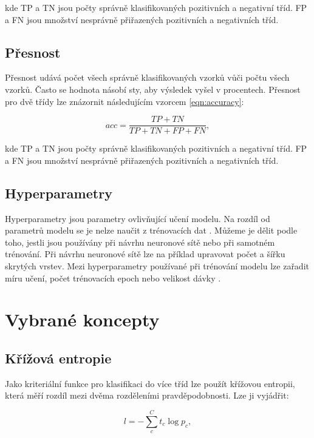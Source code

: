 \documentclass[FM,BP]{tulthesis}
\begin{document}
kde TP a TN jsou počty správně klasifikovaných pozitivních a negativní tříd. FP a FN jsou množství nesprávně přiřazených pozitivních a negativních tříd.

\subsection{Přesnost} %
Přesnost udává počet všech správně klasifikovaných vzorků vůči počtu všech vzorků. Často se hodnota násobí sty, aby výsledek vyšel v procentech. Přesnost pro dvě třídy lze znázornit následujícím vzorcem \ref{eqn:accuracy}:

\begin{equation}
\label{eqn:accuracy}
acc = \frac{TP + TN}{TP + TN + FP + FN},
\end{equation}

kde TP a TN jsou počty správně klasifikovaných pozitivních a negativní tříd. FP a FN jsou množství nesprávně přiřazených pozitivních a negativních tříd. 

\subsection{Hyperparametry} %
Hyperparametry jsou parametry ovlivňující učení modelu. Na rozdíl od parametrů modelu se je nelze naučit z trénovacích dat \cite{geron2019hands}. Můžeme je dělit podle toho, jestli jsou používány při návrhu neuronové sítě nebo při samotném trénování. Při návrhu neuronové sítě lze na příklad upravovat počet a šířku skrytých vrstev. Mezi hyperparametry používané při trénování modelu lze zařadit míru učení, počet trénovacích epoch nebo velikost dávky \cite{dagli_2021}.

\section{Vybrané koncepty}

\subsection{Křížová entropie} %
Jako kriteriální funkce pro klasifikaci do více tříd lze použít křížovou entropii, která měří rozdíl mezi dvěma rozděleními pravděpodobnosti. Lze ji vyjádřit:

\begin{equation}
\label{eqn:cross_entropy}
l = -{\sum_{c}^{C}t_{c}\log p_{c}},
\end{equation}
\end{document}
